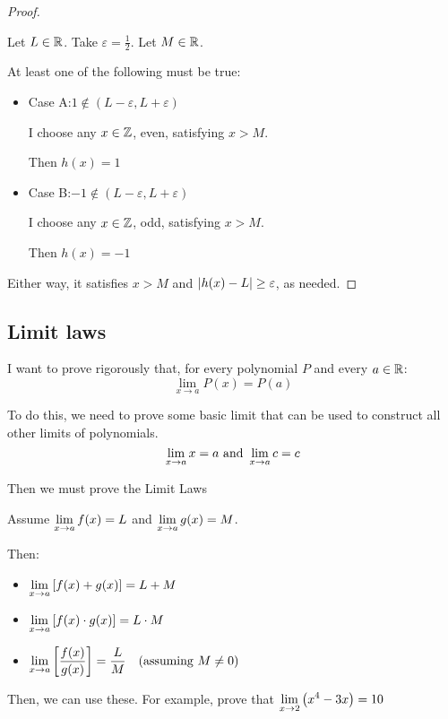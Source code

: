 \begin{proof} \(\)

  Let \(L \in \mathbb{R}\). Take \(\varepsilon = \frac{1}{2}\). Let \(M \in \mathbb{R}\).

  At least one of the following must be true:

  \begin{itemize}
    \item Case A:\quad \(1 \notin (L - \varepsilon, L + \varepsilon)\)

          I choose any \(x \in \mathbb{Z}\), even, satisfying \(x > M\).

          Then \(h(x) = 1\)

    \item Case B:\quad \(-1 \notin (L - \varepsilon, L + \varepsilon)\)

          I choose any \(x \in \mathbb{Z}\), odd, satisfying \(x > M\).

          Then \(h(x) = - 1\)
  \end{itemize}
  Either way, it satisfies \(x > M\) and \(\left|h(x) - L\right| \geq \varepsilon\), as needed. \qedhere
\end{proof}

\subsection{Limit laws}

I want to prove rigorously that, for every polynomial \(P\) and every \(a \in \mathbb{R}\):
\[\lim_{x \to a} P(x) = P(a)\]

To do this, we need to prove some basic limit that can be used to construct all other limits of polynomials.
\[\lim_{x \to a} x = a \text{ and } \lim_{x \to a} c = c\]

Then we must prove the Limit Laws

Assume \(\displaystyle \lim_{x \to a} f(x) = L\) and \(\displaystyle \lim_{x \to a} g(x) = M\).

Then:
\begin{itemize}
  \item \(\displaystyle \lim_{x \to a} \left[f(x) + g(x)\right] = L + M\)
  \item \(\displaystyle \lim_{x \to a} \left[f(x) \cdot g(x)\right] = L \cdot M\)
  \item \(\displaystyle \lim_{x \to a} \left[\frac{f(x)}{g(x)}\right] = \frac{L}{M} \quad (\text{assuming } M \neq 0)\)
\end{itemize}

Then, we can use these. For example, prove that \(\displaystyle \lim_{x \to 2} \left(x^{4} - 3x\right) = 10\)

